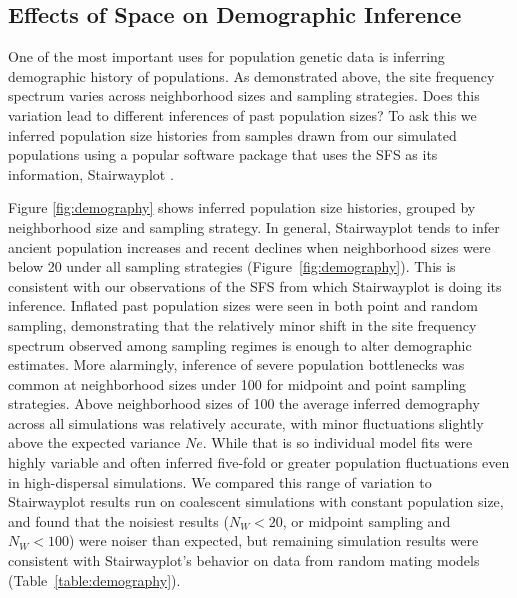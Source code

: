 \documentclass[11pt,twoside,lineno]{preprint}
\newif\ifcomments
\newcommand{\plr}[1]{\ifcomments{{\color{purple} \it (#1)}}\else{}\fi}
\begin{document}
\subsection{Effects of Space on Demographic Inference}
One of the most important uses for population genetic data is inferring demographic history of populations. As demonstrated above, the site frequency spectrum varies across neighborhood sizes and sampling strategies. Does this variation lead to different inferences of past population sizes? To ask this we inferred population size histories from samples drawn from our simulated populations using a popular software package that uses the SFS as its information, Stairwayplot \citep{Liu2015}.

\plr{revsit with smc++}
Figure \ref{fig:demography} shows inferred population size histories, grouped by neighborhood size and sampling strategy.
In general, Stairwayplot tends to infer ancient population increases and recent declines when neighborhood sizes were below 20 under all sampling strategies (Figure~\ref{fig:demography}). 
This is consistent with our observations of the SFS from which Stairwayplot is doing its inference. Inflated past population sizes were seen in both point and random sampling, demonstrating that the relatively minor shift in the site frequency spectrum observed among sampling regimes is enough to alter demographic estimates. More alarmingly, inference of severe population bottlenecks was  common at neighborhood sizes under 100 for midpoint and point sampling strategies. Above neighborhood sizes of 100 the average inferred demography across all simulations was relatively accurate, with minor fluctuations slightly above the expected variance $Ne$. While that is so individual model fits were highly variable and often inferred five-fold or greater population fluctuations even in high-dispersal simulations.  
We compared this range of variation to Stairwayplot results run on coalescent simulations with constant population size,
and found that the noisiest results ($N_W < 20$, or midpoint sampling and $N_W < 100$)
were noiser than expected, but remaining simulation results were consistent with Stairwayplot's behavior on data from random mating models (Table~\ref{table:demography}).
\end{document}
